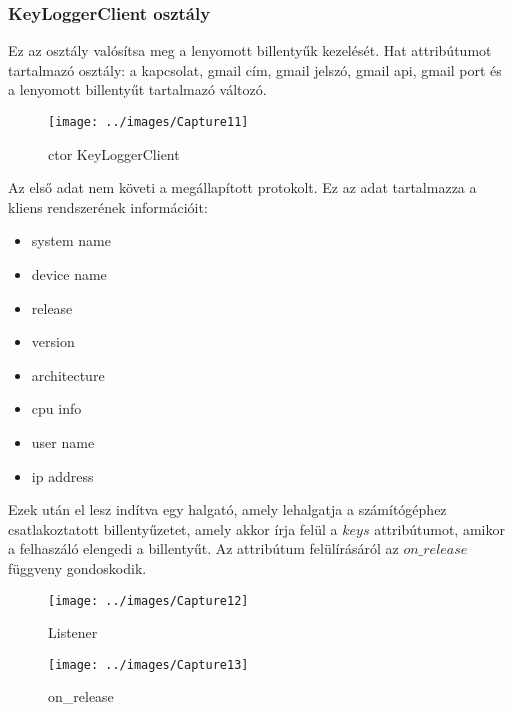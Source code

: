 \documentclass[a4paper, 11pt]{article}
\begin{document}

\subsubsection{KeyLoggerClient osztály}\label{subsubsec:keyloggerclientclass}
Ez az osztály valósítsa meg a lenyomott billentyűk kezelését. Hat attribútumot tartalmazó osztály: a kapcsolat, gmail cím, gmail jelszó, gmail api, gmail port és a lenyomott billentyűt tartalmazó változó.
\begin{figure}[H]
\centering
\texttt{[image: ../images/Capture11]}
\caption{ctor KeyLoggerClient}
\label{fig:ctorkeyloggerclient}
\end{figure}

Az első adat nem követi a megállapított protokolt. Ez az adat tartalmazza a kliens rendszerének információit:
\begin{itemize}
\item system name
\item device name
\item release
\item version
\item architecture
\item cpu info
\item user name
\item ip address
\end{itemize}
Ezek után el lesz indítva egy halgató, amely lehalgatja a számítógéphez csatlakoztatott billentyűzetet, amely akkor írja felül a $keys$ attribútumot, amikor a felhaszáló elengedi a billentyűt. Az attribútum felülírásáról az $on\_release$ függveny gondoskodik.
\begin{figure}[H]
\centering
\texttt{[image: ../images/Capture12]}
\caption{Listener}
\label{fig:listener}
\end{figure}
\begin{figure}[H]
\centering
\texttt{[image: ../images/Capture13]}
\caption{on\_release}
\label{fig:onrelease}
\end{figure}
\end{document}
